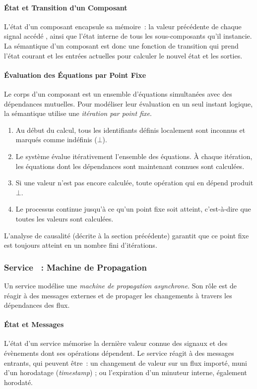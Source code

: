 \paragraph{État et Transition d'un Composant} L'état d'un composant encapsule sa mémoire~: la
valeur précédente de chaque signal accédé \via {}, ainsi que l'état interne de tous les
sous-composants qu'il instancie. La sémantique d'un composant est donc une fonction de transition
qui prend l'état courant et les entrées actuelles pour calculer le nouvel état et les sorties.

\paragraph{Évaluation des Équations par Point Fixe} Le corps d'un composant est un ensemble
d'équations simultanées avec des dépendances mutuelles. Pour modéliser leur évaluation en un seul
instant logique, la sémantique utilise une \emph{itération par point fixe}.
\begin{enumerate}
      \item Au début du calcul, tous les identifiants définis localement sont inconnus et marqués
            comme indéfinis ($\bot$).
      \item Le système évalue itérativement l'ensemble des équations. À chaque itération, les
            équations dont les dépendances sont maintenant connues sont calculées.
      \item Si une valeur n'est pas encore calculée, toute opération qui en dépend produit $\bot$.
      \item Le processus continue jusqu'à ce qu'un point fixe soit atteint, c'est-à-dire que toutes
            les valeurs sont calculées.
\end{enumerate}
L'analyse de causalité (décrite à la section précédente) garantit que ce point fixe est toujours
atteint en un nombre fini d'itérations.

\subsubsection{Service \GRFRP~: Machine de Propagation}

Un service \GRFRP modélise une \emph{machine de propagation asynchrone}. Son rôle est de réagir à
des messages externes et de propager les changements à travers les dépendances des flux.

\paragraph{État et Messages} L'état d'un service mémorise la dernière valeur connue des signaux et
des évènements dont ses opérations dépendent. Le service réagit à des messages entrants, qui peuvent
être~: un changement de valeur sur un flux importé, muni d'un horodatage (\textit{timestamp}) ; ou
l'expiration d'un minuteur interne, également horodaté.

